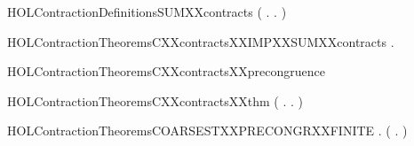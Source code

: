 \begin{SaveVerbatim}{HOLContractionDefinitionsSUMXXcontracts}
\HOLTokenTurnstile{}  \HOLSymConst{=} (\HOLTokenLambda{} . \HOLSymConst{\HOLTokenForall{}}.  \HOLSymConst{+}    \HOLSymConst{+} )
\end{SaveVerbatim}
\newcommand{\HOLContractionDefinitionsSUMXXcontracts}{\UseVerbatim{HOLContractionDefinitionsSUMXXcontracts}}
\newcommand{\HOLContractionDefinitions}{
\HOLDfnTag{Contraction}{C_contracts}\HOLContractionDefinitionsCXXcontracts
\HOLDfnTag{Contraction}{CONTRACTION}\HOLContractionDefinitionsCONTRACTION
\HOLDfnTag{Contraction}{contracts_def}\HOLContractionDefinitionscontractsXXdef
\HOLDfnTag{Contraction}{OBS_contracts}\HOLContractionDefinitionsOBSXXcontracts
\HOLDfnTag{Contraction}{SUM_contracts}\HOLContractionDefinitionsSUMXXcontracts
}
\begin{SaveVerbatim}{HOLContractionTheoremsCXXcontractsXXIMPXXSUMXXcontracts}
\HOLTokenTurnstile{} \HOLSymConst{\HOLTokenForall{}} .    \HOLSymConst{\HOLTokenImp{}}   
\end{SaveVerbatim}
\newcommand{\HOLContractionTheoremsCXXcontractsXXIMPXXSUMXXcontracts}{\UseVerbatim{HOLContractionTheoremsCXXcontractsXXIMPXXSUMXXcontracts}}
\begin{SaveVerbatim}{HOLContractionTheoremsCXXcontractsXXprecongruence}
\HOLTokenTurnstile{}  
\end{SaveVerbatim}
\newcommand{\HOLContractionTheoremsCXXcontractsXXprecongruence}{\UseVerbatim{HOLContractionTheoremsCXXcontractsXXprecongruence}}
\begin{SaveVerbatim}{HOLContractionTheoremsCXXcontractsXXthm}
\HOLTokenTurnstile{}  \HOLSymConst{=} (\HOLTokenLambda{} . \HOLSymConst{\HOLTokenForall{}}.   \HOLSymConst{\HOLTokenImp{}}     )
\end{SaveVerbatim}
\newcommand{\HOLContractionTheoremsCXXcontractsXXthm}{\UseVerbatim{HOLContractionTheoremsCXXcontractsXXthm}}
\begin{SaveVerbatim}{HOLContractionTheoremsCOARSESTXXPRECONGRXXFINITE}
\HOLTokenTurnstile{} \HOLSymConst{\HOLTokenForall{}} .
         \HOLSymConst{\HOLTokenConj{}}   \HOLSymConst{\HOLTokenImp{}}
       (   \HOLSymConst{\HOLTokenEquiv{}} \HOLSymConst{\HOLTokenForall{}}.  \HOLSymConst{+}    \HOLSymConst{+} )
\end{SaveVerbatim}
